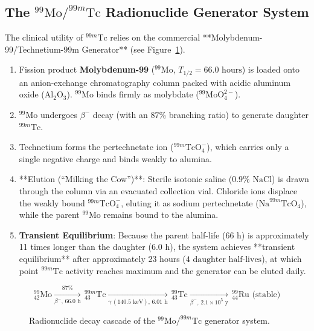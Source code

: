 \documentclass[11pt,a4paper]{article}
\begin{document}
\subsection{The $^{99}\text{Mo}/^{99m}\text{Tc}$ Radionuclide Generator System}
The clinical utility of $^{99m}\text{Tc}$ relies on the commercial **Molybdenum-99/Technetium-99m Generator** (see Figure~\ref{fig:moly_generator}).
\begin{enumerate}
    \item Fission product \textbf{Molybdenum-99} ($^{99}\text{Mo}$, $T_{1/2} = 66.0\text{ hours}$) is loaded onto an anion-exchange chromatography column packed with acidic aluminum oxide ($\text{Al}_2\text{O}_3$). $^{99}\text{Mo}$ binds firmly as molybdate ($^{99}\text{MoO}_4^{2-}$).
    \item $^{99}\text{Mo}$ undergoes $\beta^-$ decay (with an $87\%$ branching ratio) to generate daughter \textbf{$^{99m}\text{Tc}$}.
    \item Technetium forms the pertechnetate ion ($^{99m}\text{TcO}_4^-$), which carries only a single negative charge and binds weakly to alumina.
    \item **Elution (``Milking the Cow'')**: Sterile isotonic saline ($0.9\%\text{ NaCl}$) is drawn through the column via an evacuated collection vial. Chloride ions displace the weakly bound $^{99m}\text{TcO}_4^-$, eluting it as sodium pertechnetate ($\text{Na}^{99m}\text{TcO}_4$), while the parent $^{99}\text{Mo}$ remains bound to the alumina.
    \item \textbf{Transient Equilibrium}: Because the parent half-life ($66\text{ h}$) is approximately 11 times longer than the daughter ($6.0\text{ h}$), the system achieves **transient equilibrium** after approximately 23 hours ($4\text{ daughter half-lives}$), at which point $^{99m}\text{Tc}$ activity reaches maximum and the generator can be eluted daily.
\end{enumerate}

\begin{figure}[htbp]
\centering
\begin{tcolorbox}[colback=teal!5!white,colframe=teal!75!black,arc=1mm,title=\sffamily Operational Chemistry of the Moly Generator]
\small
\begin{equation*}
    ^{99}_{42}\text{Mo} \xrightarrow[\beta^-, \, 66.0\text{ h}]{87\%} \, ^{99m}_{43}\text{Tc} \xrightarrow[\gamma \, (140.5\text{ keV}), \, 6.01\text{ h}]{} \, ^{99}_{43}\text{Tc} \xrightarrow[\beta^-, \, 2.1 \times 10^5\text{ y}]{} \, ^{99}_{44}\text{Ru} \text{ (stable)}
\end{equation*}
\end{tcolorbox}
\caption{Radionuclide decay cascade of the $^{99}\text{Mo}/^{99m}\text{Tc}$ generator system.}
\label{fig:moly_generator}
\end{figure}
\end{document}
